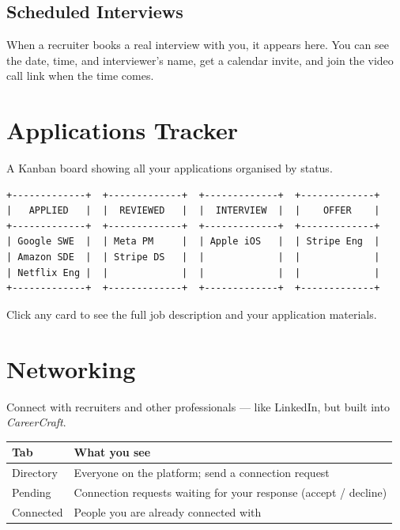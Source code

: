 \documentclass[12pt, a4paper]{report}
\newcommand{\cc}{\textit{CareerCraft}}
\begin{document}
\subsection{Scheduled Interviews}

When a recruiter books a real interview with you, it appears here.
You can see the date, time, and interviewer's name, get a calendar invite,
and join the video call link when the time comes.

\section{Applications Tracker}

A Kanban board showing all your applications organised by status.

\begin{lstlisting}[style=asciistyle, caption={Applications Kanban board}]
+-------------+  +-------------+  +-------------+  +-------------+
|   APPLIED   |  |  REVIEWED   |  |  INTERVIEW  |  |    OFFER    |
+-------------+  +-------------+  +-------------+  +-------------+
| Google SWE  |  | Meta PM     |  | Apple iOS   |  | Stripe Eng  |
| Amazon SDE  |  | Stripe DS   |  |             |  |             |
| Netflix Eng |  |             |  |             |  |             |
+-------------+  +-------------+  +-------------+  +-------------+
\end{lstlisting}

Click any card to see the full job description and your application materials.

\section{Networking}

Connect with recruiters and other professionals --- like LinkedIn,
but built into \cc{}.

\begin{center}
\begin{tabular}{ll}
\toprule
\textbf{Tab} & \textbf{What you see} \\
\midrule
Directory  & Everyone on the platform; send a connection request \\
Pending    & Connection requests waiting for your response (accept / decline) \\
Connected  & People you are already connected with \\
\bottomrule
\end{tabular}
\end{center}
\end{document}
